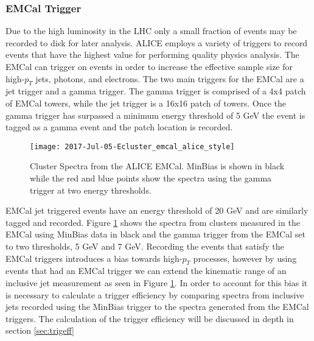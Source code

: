 \subsubsection{EMCal Trigger}


Due to the high luminosity in the LHC only a small fraction of events may be recorded to disk for later analysis.  ALICE employs a variety of triggers to record events that have the highest value for performing quality physics analysis.  The EMCal can trigger on events in order to increase the effective sample size for high-$p_{T}$ jets, photons, and electrons.  The two main triggers\cite{bourrion2010level}\cite{bourrion2013alice} for the EMCal are a jet trigger and a gamma trigger.  The gamma trigger is comprised of a 4x4 patch of EMCal towers, while the jet trigger is a 16x16 patch of towers.  Once the gamma trigger has surpassed a minimum energy threshold of 5 GeV\cite{Kral2012261} the event is tagged as a gamma event and the patch location is recorded.

\begin{figure}[h]
\texttt{[image: 2017-Jul-05-Ecluster\_emcal\_alice\_style]}
\centering
\caption{Cluster Spectra from the ALICE EMCal.  MinBias is shown in black while the red and blue points show the spectra using the gamma trigger at two energy thresholds\cite{Jahnke:2018mrq}.}
\label{fig:EMCalSpectra}
\end{figure}

EMCal jet triggered events have an energy threshold of 20 GeV and are similarly tagged and recorded.  Figure \ref{fig:EMCalSpectra} shows the spectra from clusters measured in the EMCal using MinBias data in black and the gamma trigger from the EMCal set to two thresholds, 5 GeV and 7 GeV.  Recording the events that satisfy the EMCal triggers introduces a bias towards high-$p_{T}$ processes, however by using events that had an EMCal trigger we can extend the kinematic range of an inclusive jet measurement as seen in Figure \ref{fig:EMCalSpectra}.  In order to account for this bias it is necessary to calculate a trigger efficiency by comparing spectra from inclusive jets recorded using the MinBias trigger to the spectra generated from the EMCal triggers.  The calculation of the trigger efficiency will be discussed in depth in section \ref{sec:trigeff}